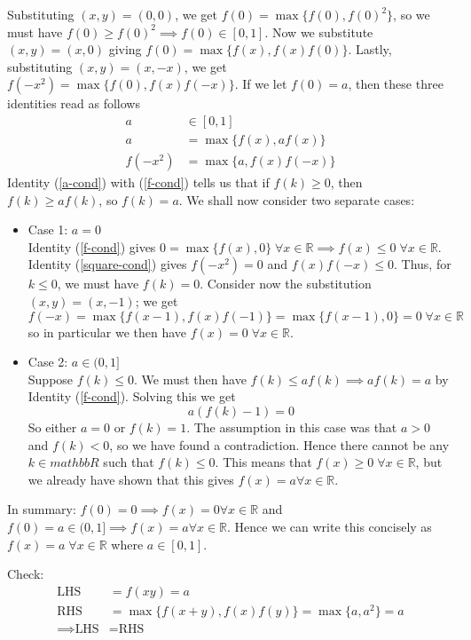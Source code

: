 \documentclass{article}
\begin{document}
\begin{enumerate}[1.]
Substituting $(x, y) = (0, 0)$, we get $f(0) = \max\{f(0), f(0)^2\}$, so we must have $f(0) \ge f(0)^2 \implies f(0) \in [0, 1]$. Now we substitute $(x, y) = (x, 0)$ giving $f(0) = \max\{f(x), f(x)f(0)\}$. Lastly, substituting $(x, y) = (x, -x)$, we get $f(-x^2) = \max\{f(0), f(x)f(-x)\}$. If we let $f(0) = a$, then these three identities read as follows
\begin{align}
a &\in [0, 1] \label{a-cond}\\
a &= \max\{f(x), af(x)\} \label{f-cond}\\
f(-x^2) &= \max\{a, f(x)f(-x)\} \label{square-cond}
\end{align}
Identity (\ref{a-cond}) with (\ref{f-cond}) tells us that if $f(k) \ge 0$, then $f(k) \ge af(k)$, so $f(k) = a$. We shall now consider two separate cases:
\begin{itemize}
  \item Case 1: $a = 0$ \\
  Identity (\ref{f-cond}) gives $0 = \max\{f(x), 0\} \; \forall x \in \mathbb{R} \implies f(x) \le 0 \; \forall x \in \mathbb{R}$. Identity (\ref{square-cond}) gives $f(-x^2) = 0$ and $f(x)f(-x) \le 0$. Thus, for $k \le 0$, we must have $f(k) = 0$. Consider now the substitution $(x,y) = (x, -1)$; we get $f(-x) = \max\{f(x - 1), f(x)f(-1)\} = \max\{f(x - 1), 0\} = 0 \; \forall x \in \mathbb{R}$ so in particular we then have $f(x) = 0 \; \forall x \in \mathbb{R}$.
  \item Case 2: $a \in (0, 1]$ \\
  Suppose $f(k) \le 0$. We must then have $f(k) \le af(k) \implies af(k) = a$ by Identity (\ref{f-cond}). Solving this we get 
  $$a(f(k) - 1) = 0 $$
  So either $a = 0$ or $f(k) = 1$. The assumption in this case was that $a > 0$ and $f(k) < 0$, so we have found a contradiction. Hence there cannot be any $k \in mathbb{R}$ such that $f(k) \le 0$. This means that $f(x) \ge 0 \; \forall x \in \mathbb{R}$, but we already have shown that this gives $f(x) = a \forall x \in \mathbb{R}$.
\end{itemize}
In summary: $f(0) = 0 \implies f(x) = 0 \forall x \in \mathbb{R}$ and $f(0) = a \in (0, 1] \implies f(x) = a \forall x \in \mathbb{R}$. Hence we can write this concisely as $f(x) = a \; \forall x \in \mathbb{R}$ where $a \in [0, 1]$.

Check:
\begin{align*}
  \text{LHS} &= f(xy) = a \\
  \text{RHS} &= \max\{f(x + y), f(x)f(y) \} = \max\{a, a^2\} = a \\
  \implies \text{LHS} &= \text{RHS}
\end{align*}

\end{enumerate}
\end{document}
